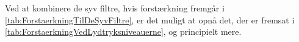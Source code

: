 \noindent
%
Ved at kombinere de syv filtre, hvis forstærkning fremgår i \autoref{tab:ForstaerkningTilDeSyvFiltre}, er det muligt at opnå det, der er fremsat i \autoref{tab:ForstaerkningVedLydtryksniveauerne}, og principielt mere.
%









%
%
%


